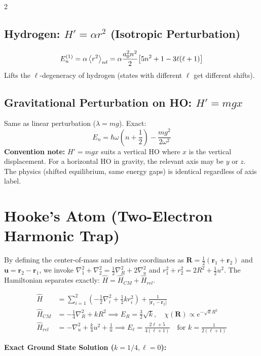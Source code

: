 \documentclass[9pt,a4paper]{article} %
\begin{document}
\begin{multicols}{2}
\subsection{Hydrogen: $H' = \alpha r^2$ (Isotropic Perturbation)}
\[
E_n^{(1)} = \alpha\ev{r^2}_{n\ell} = \alpha\frac{a_0^2 n^2}{2}\bigl[5n^2+1-3\ell(\ell+1)\bigr]
\]
Lifts the $\ell$-degeneracy of hydrogen (states with different $\ell$ get different shifts).

\subsection{Gravitational Perturbation on HO: $H'=mgx$}
Same as linear perturbation ($\lambda=mg$). Exact:
\[
E_n = \hbar\omega\!\left(n + \frac{1}{2}\right) - \frac{m g^2}{2\omega^2}
\]
{\footnotesize\textbf{Convention note:} $H'=mgx$ suits a vertical HO where $x$ is the vertical displacement. For a horizontal HO in gravity, the relevant axis may be $y$ or $z$. The physics (shifted equilibrium, same energy gaps) is identical regardless of axis label.}

\section{Hooke's Atom (Two-Electron Harmonic Trap)}

By defining the center-of-mass and relative coordinates as $\mathbf{R} = \frac{1}{2}(\mathbf{r}_1 + \mathbf{r}_2)$ and $\mathbf{u} = \mathbf{r}_2 - \mathbf{r}_1$, we invoke $\nabla_1^2 + \nabla_2^2 = \frac{1}{2}\nabla_R^2 + 2\nabla_u^2$ and $r_1^2 + r_2^2 = 2R^2 + \frac{1}{2}u^2$. The Hamiltonian separates exactly: $\hat{H} = \hat{H}_{CM} + \hat{H}_{rel}$.

\begin{equation*}
\begin{aligned}
\hat{H} &= \sum_{i=1}^2 \left(-\frac{1}{2}\nabla_i^2 + \frac{1}{2}kr_i^2\right) + \frac{1}{|\mathbf{r}_1 - \mathbf{r}_2|} \\[8pt]
\hat{H}_{CM} &= -\frac{1}{4}\nabla_R^2 + kR^2 \implies E_R = \frac{3}{2}\sqrt{k}, \quad \chi(\mathbf{R}) \propto e^{-\sqrt{k}R^2} \\[8pt]
\hat{H}_{rel} &= -\nabla_u^2 + \frac{k}{4}u^2 + \frac{1}{u} \implies E_\ell = \frac{2\ell + 5}{4(\ell+1)} \quad \text{for } k = \frac{1}{2(\ell+1)}
\end{aligned}
\end{equation*}

\textbf{Exact Ground State Solution ($k = 1/4, \ell = 0$):}


\end{multicols}
\end{document}
